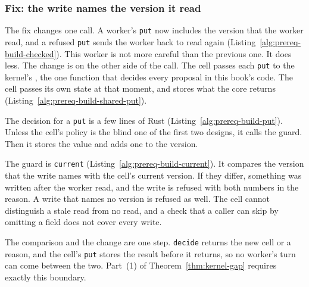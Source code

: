 \subsubsection{Fix: the write names the version it read}

The fix changes one call. A worker's \texttt{put} now includes the version
that the worker read, and a refused \texttt{put} sends the worker back to
read again (Listing~\ref{alg:prereq-build-checked}). This worker is not
more careful than the previous one. It does less. The change is on the
other side of the call. The cell passes each \texttt{put} to the kernel's
, the one function that decides every proposal in
this book's code. The cell passes its own state at that moment, and stores
what the core returns (Listing~\ref{alg:prereq-build-shared-put}).



The decision for a \texttt{put} is a few lines of Rust
(Listing~\ref{alg:prereq-build-put}). Unless the cell's policy is the blind
one of the first two designs, it calls the guard. Then it stores the value
and adds one to the version.


The guard is \texttt{current} (Listing~\ref{alg:prereq-build-current}). It
compares the version that the write names with the cell's current version.
If they differ, something was written after the worker read, and the write
is refused with both numbers in the reason. A write that names no version
is refused as well. The cell cannot distinguish a stale read from no read,
and a check that a caller can skip by omitting a field does not cover every
write.


The comparison and the change are one step. \texttt{decide} returns the new
cell or a reason, and the cell's \texttt{put} stores the result before it
returns, so no worker's turn can come between the two. Part~(1) of
Theorem~\ref{thm:kernel-gap} requires exactly this boundary.


